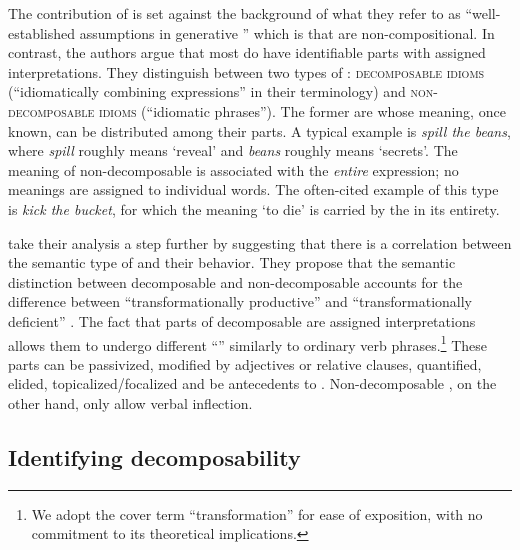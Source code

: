 \documentclass[output=paper]{langsci/langscibook}
\begin{document}
The contribution of \citet[503]{nunberg94} is set against the background of what they refer to as ``well-established assumptions in generative '' which is that  are non-compositional. In contrast, the authors argue that most  do have identifiable parts with assigned interpretations. They distinguish between two types of
: {\scshape decomposable idioms} (``idiomatically combining
expressions'' in their terminology) and {\scshape non-decomposable idioms}
(``idiomatic phrases''). The former are  whose meaning, once known, can be distributed among their parts. A typical example is \textit{spill the
  beans}, where \textit{spill} roughly means `reveal' and
\textit{beans} roughly means `secrets'. The meaning of
non-decomposable  is associated with the \emph{entire}
expression; no meanings are assigned to individual words. The
often-cited example of this type is \textit{kick the bucket}, for
which the meaning `to die' is carried by the  in its entirety.


\citet{nunberg94} take their analysis a step further by suggesting that there is a correlation between the semantic type of  and their behavior. They propose that the semantic distinction between
decomposable and non-de\-com\-pos\-able  accounts for the difference
between ``transformationally productive'' and ``transformationally
deficient'' . The fact that parts of decomposable  are
assigned interpretations allows them to undergo different
``'' similarly to ordinary verb phrases.\footnote{We adopt the cover term ``transformation'' for ease of exposition, with no commitment to its theoretical implications.} These parts
can be passivized, modified by adjectives or relative clauses,
quantified, elided, topicalized\slash focalized and be antecedents to
. Non-decomposable , on the other hand,
only allow verbal inflection.



\subsection{Identifying decomposability}
\end{document}
